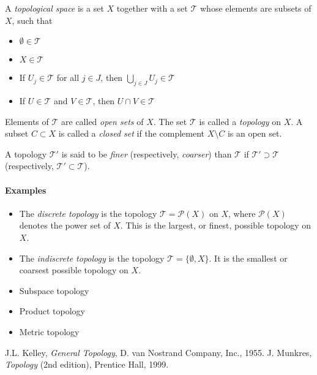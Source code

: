 \documentclass[12pt]{article}
\begin{document}
A {\em topological space} is a set $X$ together with a set $\mathcal{T}$ whose elements are subsets of $X$, such that
\begin{itemize}
\item $\emptyset \in \mathcal{T}$
\item $X \in \mathcal{T}$
\item If $U_j \in \mathcal{T}$ for all $j \in J$, then $\bigcup_{j \in J} U_j \in \mathcal{T}$
\item If $U \in \mathcal{T}$ and $V \in \mathcal{T}$, then $U \cap V \in \mathcal{T}$
\end{itemize}

Elements of $\mathcal{T}$ are called {\em open sets} of $X$. The set $\mathcal{T}$ is called a {\em topology} on $X$. A subset $C \subset X$ is called a {\em closed set} if the complement $X \setminus C$ is an open set.

A topology $\mathcal{T}'$ is said to be {\em finer} (respectively, {\em coarser}) than $\mathcal{T}$ if $\mathcal{T}' \supset \mathcal{T}$ (respectively, $\mathcal{T}' \subset \mathcal{T}$).

\paragraph{Examples}

\begin{itemize}
\item The {\em discrete topology} is the topology $\mathcal{T} = \mathcal{P}(X)$ on $X$, where $\mathcal{P}(X)$ denotes the power set of $X$.  This is the largest, or finest, possible topology on $X$.
\item The {\em indiscrete topology} is the topology $\mathcal{T} = \{\emptyset, X\}$.  It is the smallest or coarsest possible topology on $X$.
\item Subspace topology
\item Product topology
\item Metric topology
\end{itemize}


\begin{thebibliography}{9}
 J.L. Kelley, \emph{General Topology},
 D. van Nostrand Company, Inc., 1955.
 J. Munkres, \emph{Topology} (2nd edition), Prentice Hall, 1999.
\end{thebibliography}
\end{document}
